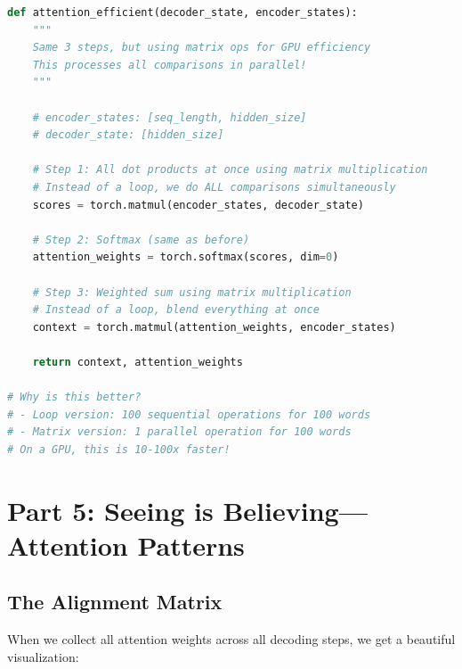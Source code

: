 \documentclass{article}
\begin{document}
\begin{lstlisting}[language=Python, caption=Attention: The PyTorch Way]
def attention_efficient(decoder_state, encoder_states):
    """
    Same 3 steps, but using matrix ops for GPU efficiency
    This processes all comparisons in parallel!
    """

    # encoder_states: [seq_length, hidden_size]
    # decoder_state: [hidden_size]

    # Step 1: All dot products at once using matrix multiplication
    # Instead of a loop, we do ALL comparisons simultaneously
    scores = torch.matmul(encoder_states, decoder_state)

    # Step 2: Softmax (same as before)
    attention_weights = torch.softmax(scores, dim=0)

    # Step 3: Weighted sum using matrix multiplication
    # Instead of a loop, blend everything at once
    context = torch.matmul(attention_weights, encoder_states)

    return context, attention_weights

# Why is this better?
# - Loop version: 100 sequential operations for 100 words
# - Matrix version: 1 parallel operation for 100 words
# On a GPU, this is 10-100x faster!
\end{lstlisting}

\section{Part 5: Seeing is Believing---Attention Patterns}

\subsection{The Alignment Matrix}

When we collect all attention weights across all decoding steps, we get a beautiful visualization:
\end{document}
